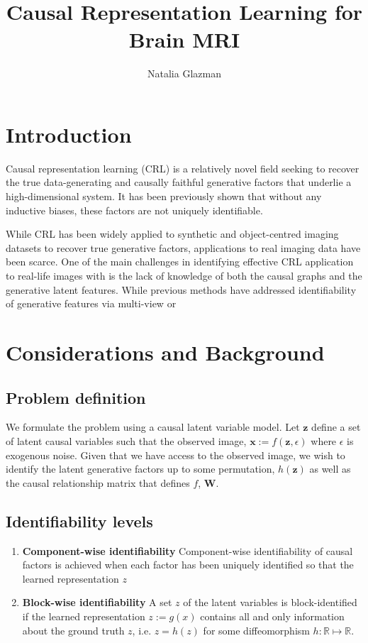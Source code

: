 \documentclass{article}
\title{Causal Representation Learning for Brain MRI}
\author{
 Natalia Glazman}
\begin{document}
\maketitle



\section{Introduction}

Causal representation learning (CRL) is a relatively novel field seeking to recover the true data-generating and causally faithful generative factors that underlie a high-dimensional system. It has been previously shown that without any inductive biases, these factors are not uniquely identifiable.

While CRL has been widely applied to synthetic and object-centred imaging datasets to recover true generative factors, applications to real imaging data have been scarce. One of the main challenges in identifying effective CRL application to real-life images with is the lack of knowledge of both the causal graphs and the generative latent features. While previous methods have addressed identifiability of generative features via multi-view or

\section{Considerations and Background}
\label{sec:headings}

\subsection{Problem definition}
We formulate the problem using a causal latent variable model. Let $\mathbf{z}$ define a set of latent causal variables such that the observed image, $\mathbf{x}:=f(\mathbf{z}, \epsilon)$ where $\epsilon$ is exogenous noise. Given that we have access to the observed image, we wish to identify the latent generative factors up to some permutation, $h(\mathbf{z})$ as well as the causal relationship matrix that defines $f$, $\mathbf{W}$.

\subsection{Identifiability levels}
\begin{enumerate}
    \item \textbf{Component-wise identifiability}
    Component-wise identifiability of causal factors is achieved when each factor has been uniquely identified so that the learned representation $z$

    \item \textbf{Block-wise identifiability}
    A set $z$ of the latent variables is block-identified if the learned representation $z := g(x)$ contains all and only information about the ground truth $z$, i.e. $z = h(z)$ for some diffeomorphism $h : \mathbb{R} \mapsto \mathbb{R}$.
\end{enumerate}
\end{document}

